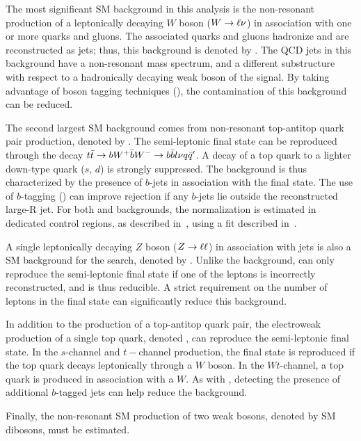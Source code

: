 The most significant SM background in this analysis is the non-resonant production of a leptonically decaying $W$ boson ($W\rightarrow\ell \nu$) in association with one or more quarks and gluons. The associated quarks and gluons hadronize and are reconstructed as jets; thus, this background is denoted by \Wjets. The QCD jets in this background have a non-resonant mass spectrum, and a different substructure with respect to a hadronically decaying weak boson of the signal. By taking advantage of boson tagging techniques (\Sect{\ref{ch:objectReconstruction:larger}}), the contamination of this background can be reduced. 

The second largest SM background comes from non-resonant top-antitop quark pair production, denoted by \ttbar. The semi-leptonic final state can be reproduced through the decay $t\bar{t} \rightarrow bW^+\bar{b}W^- \rightarrow b\bar{b}l\nu q\bar{q}'$. A decay of a top quark to a lighter down-type quark ($s$, $d$) is strongly suppressed.
The \ttbar background is thus characterized by the presence of $b$-jets in association with the final state. The use of $b$-tagging (\Sect{\ref{ch:objectReconstruction:smallr}}) can improve \ttbar rejection if any $b$-jets lie outside the reconstructed large-R jet.  For both \Wjets and \ttbar backgrounds, the normalization is estimated in dedicated control regions, as described in~\Sect{\ref{ch:eventSelection:srcr}}, using a fit described in~\Ch{\ref{ch:stats}}. 

A single leptonically decaying $Z$ boson ($Z\rightarrow \ell\ell$) in association with jets is also a SM background for the search, denoted by \Zjets. Unlike the \Wjets background, \Zjets can only reproduce the semi-leptonic final state if one of the leptons is incorrectly reconstructed, and is thus reducible. A strict requirement on the number of leptons in the final state can significantly reduce this background.

In addition to the production of a top-antitop quark pair, the electroweak production of a single top quark, denoted \Singlet, can reproduce the semi-leptonic final state. In the $s$-channel and $t-$channel production, the final state is reproduced if the top quark decays leptonically through a $W$ boson. In the $Wt$-channel, a top quark is produced in association with a $W$. As with \ttbar, detecting the presence of additional $b$-tagged jets can help reduce the \Singlet background.

Finally, the non-resonant SM production of two weak bosons, denoted by SM dibosons, must be estimated. 

